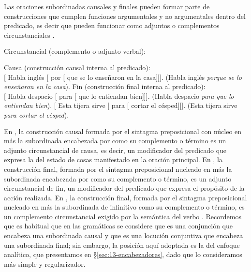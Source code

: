 Las oraciones subordinadas causales y finales pueden formar parte de
construcciones que cumplen funciones argumentales y no argumentales dentro del
predicado, es decir que pueden funcionar como adjuntos o complementos
circunstanciales .

\begin{exe}
  \ex\label{ex:13-cf} Circunstancial (complemento o adjunto verbal):
    \begin{xlist}
      \ex\label{ex:13-cf-a} Causa (construcción causal interna al predicado):\\
          {}[ Habla inglés [ por [ que se lo
          enseñaron en la casa]]]. (Habla inglés \textit{porque se lo enseñaron
          en la casa}).
      \ex\label{ex:13-cf-b} Fin (construcción final interna al predicado):\\
          {}[ Habla despacio [ para [ que lo
          entiendan bien]]]. (Habla despacio \textit{para que lo entiendan
          bien}).
      \ex\label{ex:13-cf-c} {}[ Esta tijera sirve [ para
          [ cortar el césped]]]. (Esta tijera sirve \textit{para
          cortar el césped}).
    \end{xlist}
\end{exe}

En , la construcción causal formada por el sintagma
preposicional con núcleo en  más la subordinada encabezada por
 como su complemento o término es un adjunto circunstancial de causa,
es decir, un modificador del predicado que expresa la  del estado
de cosas manifestado en la oración principal. En , la
construcción final, formada por el sintagma preposicional nucleado en
 más la subordinada encabezada por  como su complemento o
término, es un adjunto circunstancial de fin, un modificador del predicado que
expresa el propósito de la acción realizada. En , la
construcción final, formada por el sintagma preposicional nucleado en
 más la subordinada de infinitivo como su complemento o término, es
un complemento circunstancial exigido por la semántica del verbo .
Recordemos que es habitual que en las gramáticas se considere que 
es una conjunción que encabeza una subordinada causal y que  es
una locución conjuntiva que encabeza una subordinada final; sin embargo, la
posición aquí adoptada es la del enfoque analítico, que presentamos en
§\ref{sec:13-encabezadores}, dado que lo consideramos más simple y
regularizador.

